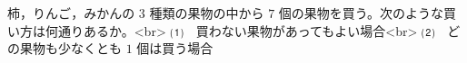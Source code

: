 柿，りんご，みかんの $3$ 種類の果物の中から $7$ 個の果物を買う。次のような買い方は何通りあるか。<br>
⑴　買わない果物があってもよい場合<br>
⑵　どの果物も少なくとも $1$ 個は買う場合

